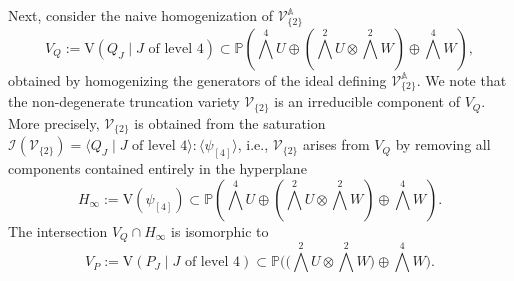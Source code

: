 \documentclass[11pt,reqno]{amsart}
\theoremstyle{definition}
\numberwithin{theorem}{section}
\numberwithin{equation}{section}
\begin{document}
\noindent Next, consider the naive homogenization of $\mathscr{V}_{\{2\}}^{\mathbb A}$
\begin{equation*}
V_Q := \textrm{V}(Q_J \mid J \textrm{ of level }4) \subset \mathbb P \textstyle{\left(\bigwedge^4U \oplus\left( \bigwedge^2 U \otimes \bigwedge^2 W \right) \oplus \bigwedge^4 W \right)},
\end{equation*}
obtained by homogenizing the generators of the ideal defining $\mathscr{V}_{\{2\}}^{\mathbb A}$. We note that the non-degenerate truncation variety $\mathscr{V}_{\{2\}}$ is an irreducible component of $V_Q$. More precisely, $\mathscr{V}_{\{2\}}$ is obtained from the saturation
$\mathcal I(\mathscr{V}_{\{2\}}) = \langle Q_J \mid J \textrm{ of level }4 \rangle : \langle \psi_{[4]}\rangle$, i.e., $\mathscr{V}_{\{2\}}$ arises from $V_Q$ by removing all components contained entirely in the hyperplane 
\begin{equation*}
H_{\infty} := \textrm{V}(\psi_{[4]}) \subset \mathbb P \textstyle{\left(\bigwedge^4U \oplus\left( \bigwedge^2 U \otimes \bigwedge^2 W \right) \oplus \bigwedge^4 W \right)}.
\end{equation*}
The intersection $V_Q \cap H_\infty$ is isomorphic to
\begin{equation*}
V_P:= \textrm{V}(P_J \mid J \textrm{ of level }4) \subset 
\textstyle{\mathbb P\big(\big( \bigwedge^2U \otimes \bigwedge^2 W \big) \oplus \bigwedge^4W \big)}. 
\end{equation*}
\end{document}
